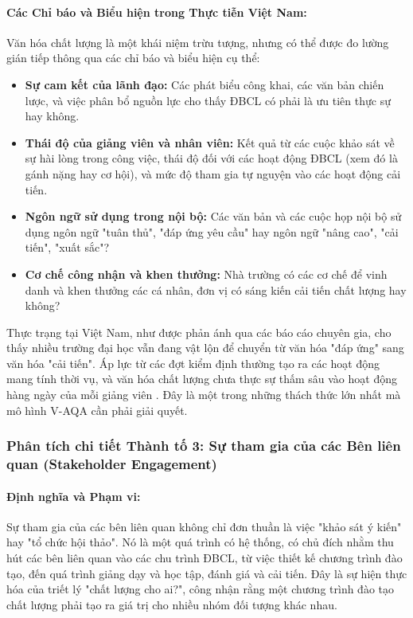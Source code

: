 \documentclass[12pt, a4paper, openany]{report}
\begin{document}
\paragraph{Các Chỉ báo và Biểu hiện trong Thực tiễn Việt Nam:}
Văn hóa chất lượng là một khái niệm trừu tượng, nhưng có thể được đo lường gián tiếp thông qua các chỉ báo và biểu hiện cụ thể:
\begin{itemize}
    \item \textbf{Sự cam kết của lãnh đạo:} Các phát biểu công khai, các văn bản chiến lược, và việc phân bổ nguồn lực cho thấy ĐBCL có phải là ưu tiên thực sự hay không.
    \item \textbf{Thái độ của giảng viên và nhân viên:} Kết quả từ các cuộc khảo sát về sự hài lòng trong công việc, thái độ đối với các hoạt động ĐBCL (xem đó là gánh nặng hay cơ hội), và mức độ tham gia tự nguyện vào các hoạt động cải tiến.
    \item \textbf{Ngôn ngữ sử dụng trong nội bộ:} Các văn bản và các cuộc họp nội bộ sử dụng ngôn ngữ "tuân thủ", "đáp ứng yêu cầu" hay ngôn ngữ "nâng cao", "cải tiến", "xuất sắc"?
    \item \textbf{Cơ chế công nhận và khen thưởng:} Nhà trường có các cơ chế để vinh danh và khen thưởng các cá nhân, đơn vị có sáng kiến cải tiến chất lượng hay không?
\end{itemize}
Thực trạng tại Việt Nam, như được phản ánh qua các báo cáo chuyên gia, cho thấy nhiều trường đại học vẫn đang vật lộn để chuyển từ văn hóa "đáp ứng" sang văn hóa "cải tiến". Áp lực từ các đợt kiểm định thường tạo ra các hoạt động mang tính thời vụ, và văn hóa chất lượng chưa thực sự thấm sâu vào hoạt động hàng ngày của mỗi giảng viên \cite{ExpertPerspectivesVN, CommonFailureCriteria}. Đây là một trong những thách thức lớn nhất mà mô hình V-AQA cần phải giải quyết.


\subsubsection{Phân tích chi tiết Thành tố 3: Sự tham gia của các Bên liên quan (Stakeholder Engagement)}
\label{subsubsec:thanh_to_3}

\paragraph{Định nghĩa và Phạm vi:}
Sự tham gia của các bên liên quan không chỉ đơn thuần là việc "khảo sát ý kiến" hay "tổ chức hội thảo". Nó là một quá trình có hệ thống, có chủ đích nhằm thu hút các bên liên quan vào các chu trình ĐBCL, từ việc thiết kế chương trình đào tạo, đến quá trình giảng dạy và học tập, đánh giá và cải tiến. Đây là sự hiện thực hóa của triết lý "chất lượng cho ai?", công nhận rằng một chương trình đào tạo chất lượng phải tạo ra giá trị cho nhiều nhóm đối tượng khác nhau.
\end{document}
